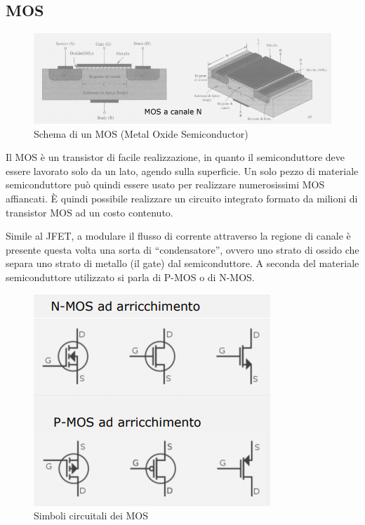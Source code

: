 \documentclass{article}
\begin{document}
\subsection{MOS}

\begin{figure}[h]
  \centering
  \includegraphics[scale=0.7]{IM_MOS}
  \caption{Schema di un MOS (Metal Oxide Semiconductor)}
  \label{Schema_MOS}
\end{figure}

Il MOS è un transistor di facile realizzazione, in quanto il semiconduttore deve essere lavorato solo da un lato, agendo sulla superficie. Un solo pezzo di materiale semiconduttore può quindi essere usato per realizzare numerosissimi MOS affiancati. È quindi possibile realizzare un circuito integrato formato da milioni di transistor MOS ad un costo contenuto.

\vspace{3mm}

Simile al JFET, a modulare il flusso di corrente attraverso la regione di canale è presente questa volta una sorta di ``condensatore'', ovvero uno strato di ossido che separa uno strato di metallo (il gate) dal semiconduttore. A seconda del materiale semiconduttore utilizzato si parla di P-MOS o di N-MOS.

\begin{figure}[h]
  \centering
  \includegraphics[width=0.4\linewidth,height=0.2\textheight]{IM_MOS_simboli}
  \caption{Simboli circuitali dei MOS}
  \label{Schema_MOS_simboli}
\end{figure}
\end{document}

